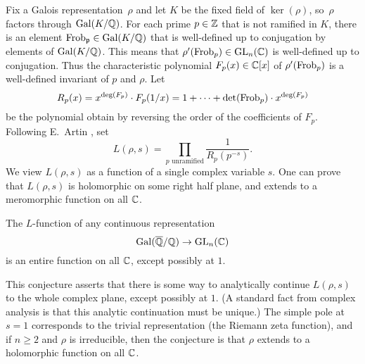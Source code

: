 {Fix a Galois representation~$\rho$ and let $K$ be the fixed field of
$\ker(\rho)$, so~$\rho$ factors through $\operatorname{Gal}(K/\mathbb{Q})$.  For each prime
$p \in \mathbb{Z}$ that is not ramified in $K$, there is an element
$\operatorname{Frob}_{\mathfrak{p}}\in\operatorname{Gal}(K/\mathbb{Q})$ that is well-defined up to conjugation by
elements of $\operatorname{Gal}(K/\mathbb{Q})$.  This means that $\rho'(\operatorname{Frob}_p)\in
\operatorname{GL}_n(\mathbb{C})$ is well-defined up to conjugation.  Thus the characteristic
polynomial $F_p(x) \in \mathbb{C}[x]$ of $\rho'(\operatorname{Frob}_p)$ is a well-defined
invariant of $p$ and $\rho$.  Let
\[
  R_p(x)
  = x^{\deg(F_p)}\cdot F_p(1/x)
  = 1 + \cdots + \det(\operatorname{Frob}_p)\cdot x^{\deg(F_p)}
\]
be the polynomial obtain
by reversing the order of the coefficients of $F_p$.
Following E.~Artin \cite{artin:conjecture, artin:conjecture2}, set
\begin{equation}\label{eqn:artin}
  L(\rho,s) = \prod_{p\text{ unramified}}\frac{1}{R_p(p^{-s})}.
\end{equation}
We view $L(\rho,s)$ as a function of a single complex variable $s$.
One can prove that $L(\rho,s)$ is holomorphic on some right
half plane, and extends to a meromorphic function on all $\mathbb{C}$.
\begin{conjecture}[Artin]\label{conj:artin}
  The $L$-function of any continuous representation
  \[
    \operatorname{Gal}(\overline{\mathbb{Q}}/\mathbb{Q}) \to \operatorname{GL}_n(\mathbb{C})
  \]
  is an entire function on all $\mathbb{C}$, except possibly at $1$.
\end{conjecture}
This conjecture asserts that there is some way to analytically continue
$L(\rho,s)$ to the whole complex plane, except possibly at $1$.
(A standard fact from complex analysis is that this analytic
continuation must be unique.)
The simple pole at $s=1$ corresponds to the trivial representation (the
Riemann zeta function), and if $n\geq 2$ and $\rho$ is irreducible,
then the conjecture is that $\rho$ extends to a holomorphic function
on all $\mathbb{C}$.

}
